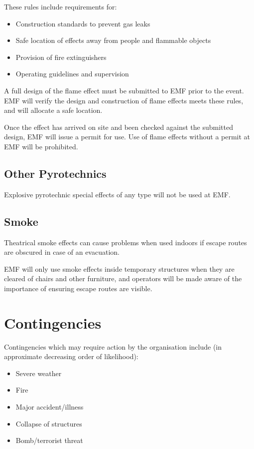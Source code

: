 These rules include requirements for:
\begin{itemize}
    \tightlist
    \item Construction standards to prevent gas leaks
    \item Safe location of effects away from people and flammable objects
    \item Provision of fire extinguishers
    \item Operating guidelines and supervision
\end{itemize}

A full design of the flame effect must be submitted to EMF prior to the
event. EMF will verify the design and construction of flame effects meets
these rules, and will allocate a safe location.

Once the effect has arrived on site and been checked against the submitted
design, EMF will issue a permit for use. Use of flame effects without a
permit at EMF will be prohibited.

\subsection{Other Pyrotechnics}
Explosive pyrotechnic special effects of any type will not be used at EMF.

\subsection{Smoke}
Theatrical smoke effects can cause problems when used indoors if escape
routes are obscured in case of an evacuation.

EMF will only use smoke effects inside temporary structures when they are
cleared of chairs and other furniture, and operators will be made aware of
the importance of ensuring escape routes are visible.

\newpage

\section{Contingencies}\label{contingencies}
Contingencies which may require action by the organisation include (in
approximate decreasing order of likelihood):

\begin{itemize}
    \tightlist
    \item Severe weather
    \item Fire
    \item Major accident/illness
    \item Collapse of structures
    \item Bomb/terrorist threat
\end{itemize}

